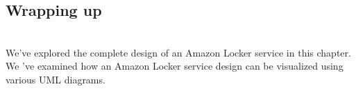 \subsection{Wrapping up}\label{_FM1DBRLxFVNgQAcR3p2f-5}
\\
We've explored the complete design of an Amazon Locker service in this chapter. We 've examined how an Amazon Locker service design can be visualized using various UML diagrams.

\subsection{}\label{UfRx8ujROzMhBbVVhcNjR}

